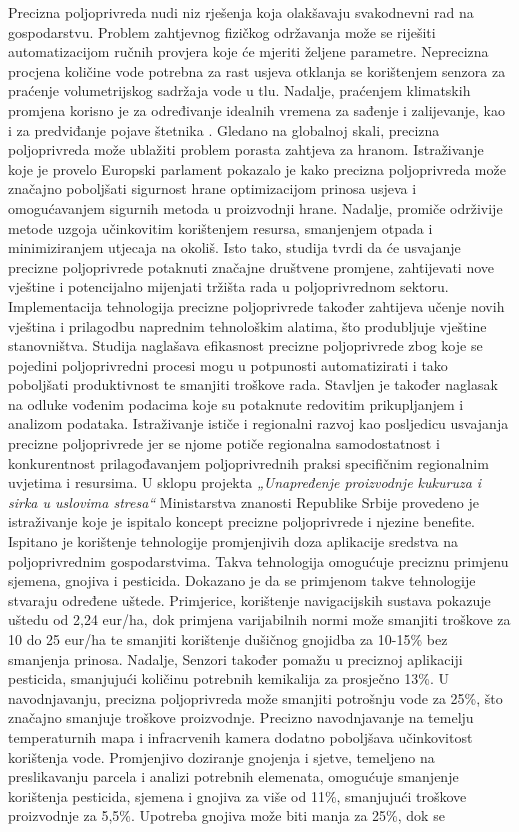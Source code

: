Precizna poljoprivreda nudi niz rješenja koja olakšavaju svakodnevni rad na gospodarstvu. Problem zahtjevnog fizičkog održavanja može se riješiti automatizacijom ručnih provjera koje će mjeriti željene parametre. Neprecizna procjena količine vode potrebna za rast usjeva otklanja se korištenjem senzora za praćenje volumetrijskog sadržaja vode u tlu. Nadalje, praćenjem klimatskih promjena korisno je za određivanje idealnih vremena za sađenje i zalijevanje, kao i za predviđanje pojave štetnika \cite{iotnet_usecase}. Gledano na globalnoj skali, precizna poljoprivreda može ublažiti problem porasta zahtjeva za hranom. Istraživanje koje je provelo Europski parlament \cite{eu_study} pokazalo je kako precizna poljoprivreda može značajno poboljšati sigurnost hrane optimizacijom prinosa usjeva i omogućavanjem sigurnih metoda u proizvodnji hrane. Nadalje, promiče održivije metode uzgoja učinkovitim korištenjem resursa, smanjenjem otpada i minimiziranjem utjecaja na okoliš. Isto tako, studija tvrdi da će usvajanje precizne poljoprivrede potaknuti značajne društvene promjene, zahtijevati nove vještine i potencijalno mijenjati tržišta rada u poljoprivrednom sektoru. Implementacija tehnologija precizne poljoprivrede također zahtijeva učenje novih vještina i prilagodbu naprednim tehnološkim alatima, što produbljuje vještine stanovništva. Studija naglašava efikasnost precizne poljoprivrede zbog koje se pojedini poljoprivredni procesi mogu u potpunosti automatizirati i tako poboljšati produktivnost te smanjiti troškove rada. Stavljen je također naglasak na odluke vođenim podacima  koje su potaknute redovitim prikupljanjem i analizom podataka. Istraživanje ističe i regionalni razvoj kao posljedicu usvajanja precizne poljoprivrede jer se njome potiče regionalna samodostatnost i konkurentnost prilagođavanjem poljoprivrednih praksi specifičnim regionalnim uvjetima i resursima. U sklopu projekta \textit{„Unapređenje proizvodnje kukuruza i sirka u uslovima stresa“} Ministarstva znanosti Republike Srbije provedeno je istraživanje \cite{srbija_study} koje je ispitalo koncept precizne poljoprivrede i njezine benefite. Ispitano je korištenje tehnologije promjenjivih doza aplikacije sredstva  na poljoprivrednim gospodarstvima. Takva tehnologija omogućuje preciznu primjenu sjemena, gnojiva i pesticida. Dokazano je da se primjenom takve tehnologije stvaraju određene uštede. Primjerice, korištenje navigacijskih sustava pokazuje uštedu od 2,24 eur/ha, dok primjena varijabilnih normi može smanjiti troškove za 10 do 25 eur/ha te smanjiti korištenje dušičnog gnojidba za 10-15\% bez smanjenja prinosa. Nadalje, Senzori također pomažu u preciznoj aplikaciji pesticida, smanjujući količinu potrebnih kemikalija za prosječno 13\%. U navodnjavanju, precizna poljoprivreda može smanjiti potrošnju vode za 25\%, što značajno smanjuje troškove proizvodnje. Precizno navodnjavanje na temelju temperaturnih mapa i infracrvenih kamera dodatno poboljšava učinkovitost korištenja vode. Promjenjivo doziranje gnojenja i sjetve, temeljeno na preslikavanju parcela i analizi potrebnih elemenata, omogućuje smanjenje korištenja pesticida, sjemena i gnojiva za više od 11\%, smanjujući troškove proizvodnje za 5,5\%. Upotreba gnojiva može biti manja za 25\%, dok se 